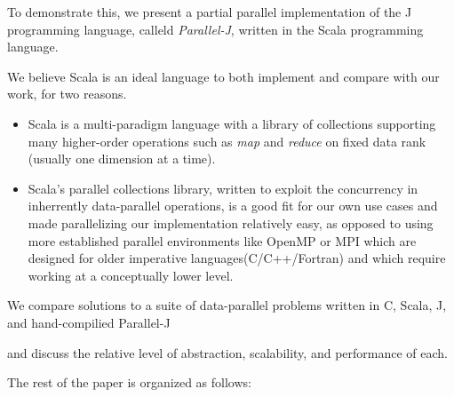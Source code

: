 To demonstrate this, we present a partial parallel implementation of the J programming language, calleld \textit{Parallel-J}, written in the Scala programming language.\begin{comment}TODO cite?\end{comment}
We believe Scala is an ideal language to both implement and compare with our work, for two reasons.
\begin{itemize}
    \item Scala is a multi-paradigm language with a library of collections supporting many higher-order operations such as \textit{map} and \textit{reduce} on fixed data rank (usually one dimension at a time).%
    \item Scala's parallel collections library\cite{pc}, written to exploit the concurrency in inherrently data-parallel operations, is a good fit for our own use cases and made parallelizing our implementation relatively easy, as opposed to using more established parallel environments like OpenMP or MPI which are designed for older imperative languages(C/C++/Fortran) and which require working at a conceptually lower level.
\end{itemize}
We compare solutions to a suite of data-parallel problems written in C, Scala, J, and hand-compilied Parallel-J\begin{comment}TODO really should change name\end{comment} and discuss the relative level of abstraction, scalability, and performance of each.

The rest of the paper is organized as follows:
\begin{itemize}

\end{itemize}

\nocite{rankanduni}
\nocite{dph}

